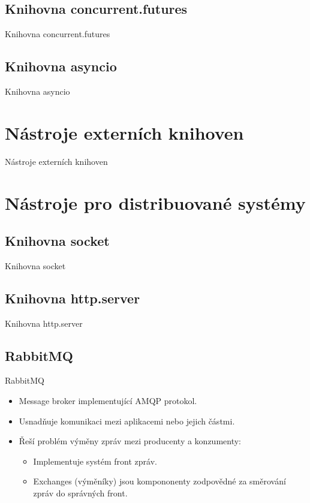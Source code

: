 \documentclass{beamer}
\begin{document}
\subsection{Knihovna concurrent.futures}
\begin{frame}{Knihovna concurrent.futures}

\end{frame}

\subsection{Knihovna asyncio}
\begin{frame}{Knihovna asyncio}

\end{frame}

\section{Nástroje externích knihoven}
\begin{frame}{Nástroje externích knihoven}

\end{frame}

\section{Nástroje pro distribuované systémy}
\subsection{Knihovna socket}
\begin{frame}{Knihovna socket}

\end{frame}

\subsection{Knihovna http.server}
\begin{frame}{Knihovna http.server}

\end{frame}

\subsection{RabbitMQ}
\begin{frame}{RabbitMQ}
	\begin{itemize}
		\item Message broker implementující AMQP protokol.
		\item Usnadňuje komunikaci mezi aplikacemi nebo jejich částmi.
		\item Řeší problém výměny zpráv mezi producenty a konzumenty:
		\begin{itemize}
			\item [\textendash] Implementuje systém front zpráv.
			\item [\textendash] Exchanges (výměníky) jsou kompononenty zodpovědné za směrování zpráv 					  do správných front.
		\end{itemize}
	\end{itemize}

\end{frame}
\end{document}
